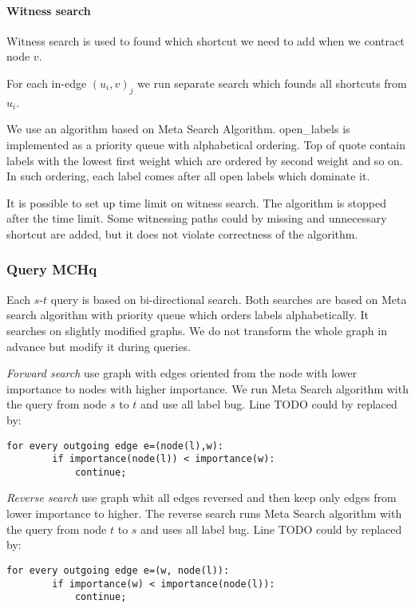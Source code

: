 \paragraph*{Witness search}

Witness search is used to found which shortcut we need to add when we contract 
node $v$.

For each in-edge $(u_i,v)_j$ we run separate search which founds all shortcuts 
from $u_i$.

We use an algorithm based on Meta Search Algorithm. 
open\_labels 
is implemented as a priority queue with alphabetical ordering. Top of quote contain labels with the lowest first weight which are ordered by second weight and so on. 
In such ordering, each label comes after all open labels which dominate it.

It is possible to set up time limit on witness search. The algorithm is stopped after the time limit. Some witnessing paths could by missing and unnecessary shortcut are added, but it does not violate correctness of the algorithm.

\subsubsection{Query MCHq}

Each $s$-$t$ query is based on bi-directional search.
Both searches are based on Meta search algorithm with priority queue which orders labels
alphabetically. It searches on slightly modified graphs. We do not transform the whole
graph in advance but modify it during queries.

\emph{Forward search} use graph with edges
oriented from the node with lower importance to nodes with higher importance.
We run Meta Search algorithm with the query from node $s$ to $t$ and use all label bug.
Line TODO could by replaced by:

\begin{lstlisting}[caption={MCHp},label=list:8-6,captionpos=t,float,abovecaptionskip=-\medskipamount]
    for every outgoing edge e=(node(l),w):
    	if importance(node(l)) < importance(w):
        	continue;
\end{lstlisting}

\emph{Reverse search} use graph whit all edges reversed and then keep only edges
from lower importance to higher. 
The reverse search runs Meta Search algorithm with the query from node $t$ to $s$ and uses all label bug.
Line TODO could by replaced by:

\begin{lstlisting}[caption={MCHp},label=list:8-6,captionpos=t,float,abovecaptionskip=-\medskipamount]
    for every outgoing edge e=(w, node(l)):
    	if importance(w) < importance(node(l)):
        	continue;
\end{lstlisting}

